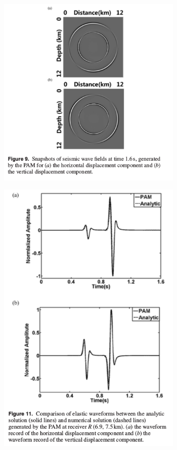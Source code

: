 \documentclass{article}
\begin{document}
\begin{figure}[h] 
    \begin{subfigure}{0.5\textwidth}
    \includegraphics[width=1\linewidth]{2D_seismic_tests/circle1.png} 
    \end{subfigure}
    \begin{subfigure}{0.5\textwidth}
    \includegraphics[width=0.7\linewidth]{2D_seismic_tests/circle2.png}
    \end{subfigure}
\end{figure}
\end{document}
